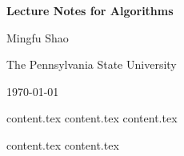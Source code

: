 \documentclass[letterpaper,11pt]{article}
\theoremstyle{mytheorem}
\begin{document}

\thispagestyle{titlestyle}
\begin{center}
\vspace*{4cm} {\huge \bf Lecture Notes for Algorithms } \vspace*{2cm}

{\large  Mingfu Shao}

{\large  The Pennsylvania State University}

{\large  \today}
\end{center}

\clearpage \newpage


\makeatletter
\renewcommand{\l@section}{\@dottedtocline{1}{0em}{5em}}
\makeatother

\thispagestyle{tablestyle}
\tableofcontents \thispagestyle{tablestyle} \clearpage \newpage



{content.tex} \clearpage\newpage
{content.tex} \clearpage\newpage
{content.tex} \clearpage\newpage

{content.tex} \clearpage\newpage
{content.tex} \clearpage\newpage
\end{document}
